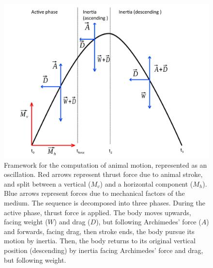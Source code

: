 \documentclass[utf8, 12 pt]{frontiers_suppmat}
\begin{document}
\clearpage
\begin{figure}[ht]
\begin{center}
\doublespacing
\includegraphics[width = 18 cm, keepaspectratio]{Figure_Forces}
\caption{Framework for the computation of animal motion, represented as an oscillation. Red arrows represent thrust force due to animal stroke, and split between a vertical ($M_v$) and a horizontal component ($M_h$). Blue arrows represent forces due to mechanical factors of the medium. The sequence is decomposed into three phases. During the active phase, thrust force is applied. The body moves upwards, facing weight ($W$) and drag ($D$), but following Archimedes’ force ($A$) and forwards, facing drag, then stroke ends, the body pursue its motion by inertia. Then, the body returns to its original vertical position (descending) by inertia facing Archimedes’ force and drag, but following weight.}
\end{center}
\end{figure}
\end{document}
